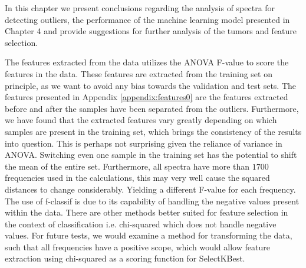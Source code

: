 
In this chapter we present conclusions regarding the analysis of spectra for detecting outliers, the performance of the machine learning model presented in Chapter 4 and provide suggestions for further analysis of the tumors and feature selection.

The features extracted from the data utilizes the ANOVA F-value to score the features in the data. These features are extracted from the training set on principle, as we want to avoid any bias towards the validation and test sets. The features presented in Appendix \ref{appendix:features0} are the features extracted before and after the samples have been separated from the outliers. Furthermore, we have found that the extracted features vary greatly depending on which samples are present in the training set, which brings the consistency of the results into question. This is perhaps not surprising given the reliance of variance in ANOVA. Switching even one sample in the training set has the potential to shift the mean of the entire set. Furthermore, all spectra have more than $1700$ frequencies used in the calculations, this may very well cause the squared distances to change considerably. Yielding a different F-value for each frequency. The use of f-classif is due to its capability of handling the negative values present within the data. There are other methods better suited for feature selection in the context of classification i.e. chi-squared which does not handle negative values. For future tests, we would examine a method for transforming the data, such that all frequencies have a positive scope, which would allow feature extraction using chi-squared as a scoring function for SelectKBest.

